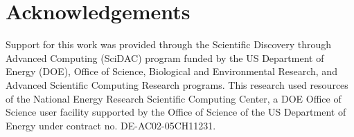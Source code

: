 \documentclass[tc, manuscript]{copernicus}
\begin{document}


\section{Acknowledgements}
Support for this work was provided through the Scientific Discovery through Advanced Computing (SciDAC) program funded by the US Department of Energy (DOE), Office of Science, Biological and Environmental Research, and Advanced Scientific Computing Research programs. This research used resources of the National Energy Research Scientific Computing Center, a DOE Office of Science user facility supported by the Office of Science of the US Department of Energy under contract no. DE-AC02-05CH11231.






%
\end{document}
